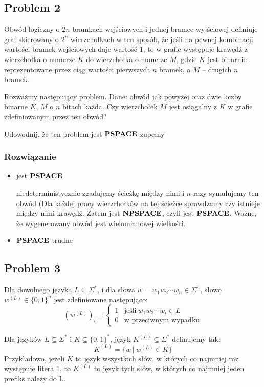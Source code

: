 \subsection{Problem 2}
Obwód logiczny o $2n$ bramkach wejściowych i jednej bramce wyjściowej definiuje graf skierowany o $2^n$ wierzchołkach w ten sposób, że jeśli na pewnej kombinacji wartości bramek wejściowych daje wartość $1$, to w grafie występuje krawędź z wierzchołka o numerze $K$ do wierzchołka o numerze $M$, gdzie $K$ jest binarnie reprezentowane przez ciąg wartości pierwszych $n$ bramek, a $M$ – drugich $n$ bramek.

Rozważmy następujący problem. Dane: obwód jak powyżej oraz dwie liczby binarne $K$, $M$ o $n$ bitach każda. Czy wierzchołek $M$ jest osiągalny z $K$ w grafie zdefiniowanym przez ten obwód?

Udowodnij, że ten problem jest $\textbf{PSPACE}$-zupełny

\subsubsection*{Rozwiązanie}

\begin{itemize}
    \item jest $\textbf{PSPACE}$
    
    niedeterministycznie zgadujemy ścieżkę między nimi i $n$ razy symulujemy ten obwód (Dla każdej pracy wierzchołków na tej ścieżce sprawdzamy czy istnieje między nimi krawędź. Zatem jest $\textbf{NPSPACE}$, czyli jest $\textbf{PSPACE}$. Ważne, że wygenerowany obwód jest wielomianowej wielkości.
    
    \item $\textbf{PSPACE}$-trudne
\end{itemize}

\subsection{Problem 3}
Dla dowolnego języka $L \subseteq \Sigma^*$, i dla słowa $w= w_1w_2\cdots w_n \in \Sigma^n$, słowo $w^{(L)} \in \{0, 1\}^n$ jest zdefiniowane następująco:
\[
    \left(w^{(L)}\right)_i = \left\{ 
    \begin{array}{ll}
        1 & \textrm{jeśli}\ w_1w_2\cdots w_i \in L \\
        0 & \textrm{w przeciwnym wypadku}
    \end{array}
    \right.
\]

Dla języków $L \subseteq \Sigma^*$ i $K \subseteq \{0, 1\}^*$, język $K^{(L)} \subseteq \Sigma^*$ definujemy tak:
\[
    K^{(L)} = \{ w\ |\ w^{(L)} \in K\}
\]
Przykładowo, jeżeli $K$ to język wszystkich słów, w których co najmniej raz występuje litera $1$, to $K^{(L)}$ to język tych słów, w których co najmniej jeden prefiks należy do L.

